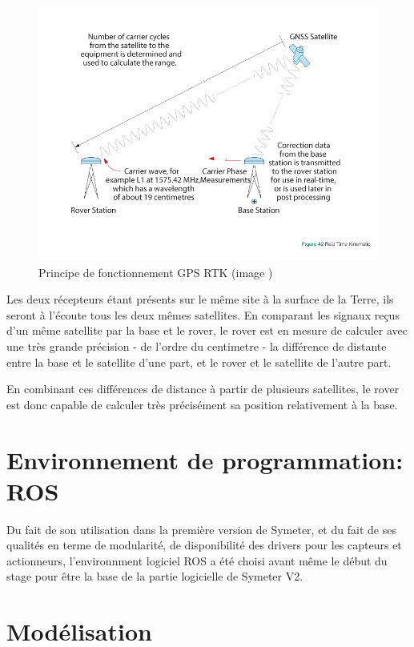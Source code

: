 \documentclass[12pt,a4paper]{report}
\begin{document}
		\begin{figure}[h!]
			\centering
			\includegraphics[width=0.7\linewidth]{img/rtk}
			\caption[gpsrtk]{Principe de fonctionnement GPS RTK (image \cite{jeffrey_introduction_2010}) }
			\label{fig:rtk}
		\end{figure}
	
		\para Les deux récepteurs étant présents sur le même site à la surface de la Terre, ils seront à l'écoute tous les deux mêmes satellites. En comparant les signaux reçus d'un même satellite par la base et le rover, le rover est en mesure de calculer avec une très grande précision - de l'ordre du centimetre - la différence de distante entre la base et le satellite d'une part, et le rover et le satellite de l'autre part. 
		

		\para En combinant ces différences de distance à partir de plusieurs satellites, le rover est donc capable de calculer très précisément sa position relativement à la base.
		\newpage
		
		
	\section{Environnement de programmation: ROS}
	Du fait de son utilisation dans la première version de Symeter, et du fait de ses qualités en terme de modularité, de disponibilité des drivers pour les capteurs et actionneurs, l'environnment logiciel ROS a été choisi avant même le début du stage pour être la base de la partie logicielle de Symeter V2.

	
	
		
	\section{Modélisation}
	
\end{document}
